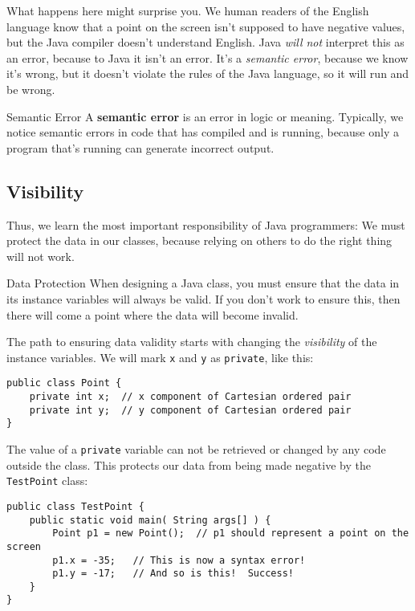 What happens here might surprise you.  We human readers of the English language know that a point on the screen isn't supposed to have negative values, but the Java compiler doesn't understand English.  Java \textit{will not} interpret this as an error, because to Java it isn't an error.  It's a \textit{semantic error}, because we know it's wrong, but it doesn't violate the rules of the Java language, so it will run and be wrong.

\begin{defn}{Semantic Error}
    A \textbf{semantic error} is an error in logic or meaning.  Typically, we notice semantic errors in code that has compiled and is running, because only a program that's running can generate incorrect output.
\end{defn}

\subsection{Visibility}

Thus, we learn the most important responsibility of Java programmers: We must protect the data in our classes, because relying on others to do the right thing will not work.

\begin{tip}{Data Protection}
    When designing a Java class, you must ensure that the data in its instance variables will always be valid.  If you don't work to ensure this, then there will come a point where the data will become invalid.
\end{tip}

The path to ensuring data validity starts with changing the \textit{visibility} of the instance variables.  We will mark \texttt{x} and \texttt{y} as \texttt{private}, like this:

\begin{verbatim}
public class Point {
    private int x;  // x component of Cartesian ordered pair
    private int y;  // y component of Cartesian ordered pair
}
\end{verbatim}

The value of a \texttt{private} variable can not be retrieved or changed by any code outside the class.  This protects our data from being made negative by the \texttt{TestPoint} class:

\begin{verbatim}
public class TestPoint {
    public static void main( String args[] ) {
        Point p1 = new Point();  // p1 should represent a point on the screen
        p1.x = -35;   // This is now a syntax error!
        p1.y = -17;   // And so is this!  Success!
    }
}
\end{verbatim}

